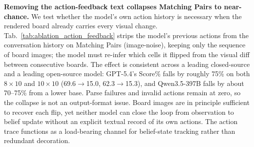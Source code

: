 \documentclass{llmxive}
\begin{document}



\noindent\textbf{Removing the action-feedback text collapses Matching Pairs to near-chance.}\label{sec:diag_action_feedback}
We test whether the model's own action history is necessary when the rendered board already carries every visual change. Tab.~\ref{tab:ablation_action_feedback} strips the model's previous actions from the conversation history on Matching Pairs (image-noise), keeping only the sequence of board images; the model must re-infer which cells it flipped from the visual diff between consecutive boards. The effect is consistent across a leading closed-source and a leading open-source model: GPT-5.4's Score\% falls by roughly 75\% on both $8{\times}10$ and $10{\times}10$ (69.6$\to$15.0, 62.3$\to$15.3), and Qwen3.5-397B falls by about 70--75\% from a lower base. Parse failures and invalid actions remain at zero, so the collapse is not an output-format issue. Board images are in principle sufficient to recover each flip, yet neither model can close the loop from observation to belief update without an explicit textual record of its own actions. The action trace functions as a load-bearing channel for belief-state tracking rather than redundant decoration.
\end{document}
